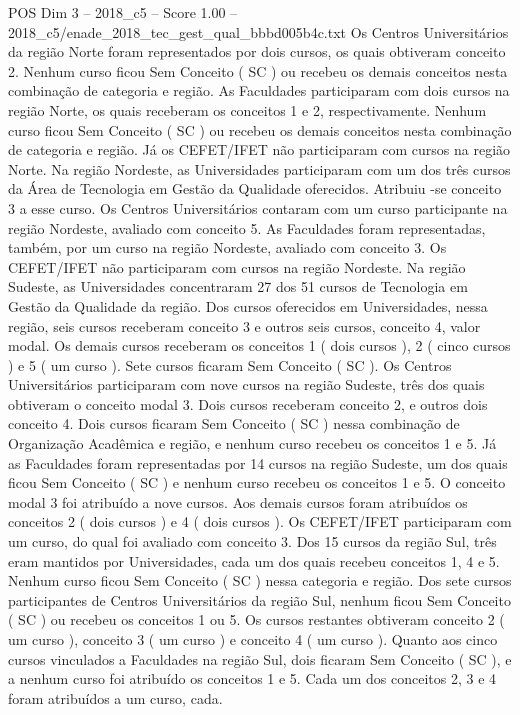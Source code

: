 \begin{textsample}{POS Dim 3 – 2018\_c5 – Score 1.00 – 2018\_c5/enade\_2018\_tec\_gest\_qual\_bbbd005b4c.txt}
Os Centros Universitários da região Norte foram representados por dois cursos, os quais obtiveram conceito 2.
Nenhum curso ficou Sem Conceito ( SC ) ou recebeu os demais conceitos nesta combinação de categoria e região.
As Faculdades participaram com dois cursos na região Norte, os quais receberam os conceitos 1 e 2, respectivamente.
Nenhum curso ficou Sem Conceito ( SC ) ou recebeu os demais conceitos nesta combinação de categoria e região.
Já os CEFET/IFET não participaram com cursos na região Norte.
Na região Nordeste, as Universidades participaram com um dos três cursos da Área de Tecnologia em Gestão da Qualidade oferecidos.
Atribuiu -se conceito 3 a esse curso.
Os Centros Universitários contaram com um curso participante na região Nordeste, avaliado com conceito 5.
As Faculdades foram representadas, também, por um curso na região Nordeste, avaliado com conceito 3.
Os CEFET/IFET não participaram com cursos na região Nordeste.
Na região Sudeste, as Universidades concentraram 27 dos 51 cursos de Tecnologia em Gestão da Qualidade da região.
Dos cursos oferecidos em Universidades, nessa região, seis cursos receberam conceito 3 e outros seis cursos, conceito 4, valor modal.
Os demais cursos receberam os conceitos 1 ( dois cursos ), 2 ( cinco cursos ) e 5 ( um curso ).
Sete cursos ficaram Sem Conceito ( SC ).
Os Centros Universitários participaram com nove cursos na região Sudeste, três dos quais obtiveram o conceito modal 3.
Dois cursos receberam conceito 2, e outros dois conceito 4.
Dois cursos ficaram Sem Conceito ( SC ) nessa combinação de Organização Acadêmica e região, e nenhum curso recebeu os conceitos 1 e 5.
Já as Faculdades foram representadas por 14 cursos na região Sudeste, um dos quais ficou Sem Conceito ( SC ) e nenhum curso recebeu os conceitos 1 e 5.
O conceito modal 3 foi atribuído a nove cursos.
Aos demais cursos foram atribuídos os conceitos 2 ( dois cursos ) e 4 ( dois cursos ).
Os CEFET/IFET participaram com um curso, do qual foi avaliado com conceito 3.
Dos 15 cursos da região Sul, três eram mantidos por Universidades, cada um dos quais recebeu conceitos 1, 4 e 5.
Nenhum curso ficou Sem Conceito ( SC ) nessa categoria e região.
Dos sete cursos participantes de Centros Universitários da região Sul, nenhum ficou Sem Conceito ( SC ) ou recebeu os conceitos 1 ou 5.
Os cursos restantes obtiveram conceito 2 ( um curso ), conceito 3 ( um curso ) e conceito 4 ( um curso ).
Quanto aos cinco cursos vinculados a Faculdades na região Sul, dois ficaram Sem Conceito ( SC ), e a nenhum curso foi atribuído os conceitos 1 e 5.
Cada um dos conceitos 2, 3 e 4 foram atribuídos a um curso, cada.

\end{textsample}
